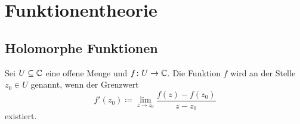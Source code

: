
\chapter{Funktionentheorie}
\section{Holomorphe Funktionen}

\begin{definition}\mbox{}\newline
Sei $U\subseteq\mathbb C$ eine offene Menge und $f\colon U\to\mathbb C$.
Die Funktion $f$ wird  an der
Stelle $z_0\in U$ genannt, wenn der Grenzwert%
\begin{equation}
f'(z_0)\coloneq \lim_{z\to z_0} \frac{f(z)-f(z_0)}{z-z_0}
\end{equation}
existiert.
\end{definition}


